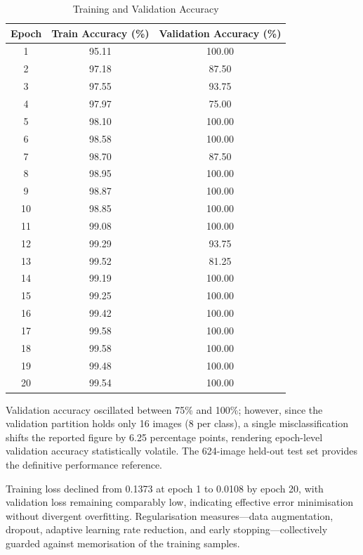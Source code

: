 \documentclass[conference]{IEEEtran}
\begin{document}
\begin{table}[h]
\centering
\caption{Training and Validation Accuracy}
\label{tab:epoch_accuracy}
\begin{tabular}{|c|c|c|}
\hline
\textbf{Epoch} & \textbf{Train Accuracy (\%)} & \textbf{Validation Accuracy (\%)} \\ \hline
1  & 95.11 & 100.00 \\ \hline
2  & 97.18 & 87.50 \\ \hline
3  & 97.55 & 93.75 \\ \hline
4  & 97.97 & 75.00 \\ \hline
5  & 98.10 & 100.00 \\ \hline
6  & 98.58 & 100.00 \\ \hline
7  & 98.70 & 87.50 \\ \hline
8  & 98.95 & 100.00 \\ \hline
9  & 98.87 & 100.00 \\ \hline
10 & 98.85 & 100.00 \\ \hline
11 & 99.08 & 100.00 \\ \hline
12 & 99.29 & 93.75 \\ \hline
13 & 99.52 & 81.25 \\ \hline
14 & 99.19 & 100.00 \\ \hline
15 & 99.25 & 100.00 \\ \hline
16 & 99.42 & 100.00 \\ \hline
17 & 99.58 & 100.00 \\ \hline
18 & 99.58 & 100.00 \\ \hline
19 & 99.48 & 100.00 \\ \hline
20 & 99.54 & 100.00 \\ \hline
\end{tabular}
\end{table}

Validation accuracy oscillated between 75\% and 100\%; however, since the validation partition holds only 16 images (8 per class), a single misclassification shifts the reported figure by 6.25 percentage points, rendering epoch-level validation accuracy statistically volatile. The 624-image held-out test set provides the definitive performance reference.

Training loss declined from 0.1373 at epoch 1 to 0.0108 by epoch 20, with validation loss remaining comparably low, indicating effective error minimisation without divergent overfitting. Regularisation measures---data augmentation, dropout, adaptive learning rate reduction, and early stopping---collectively guarded against memorisation of the training samples.
\end{document}
